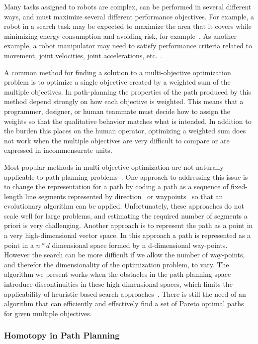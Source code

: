 \documentclass[phd]{byuprop}
\begin{document}
Many tasks assigned to robots are complex, can be performed in several different ways, and must maximize several different performance objectives.
For example, a robot in a search task may be expected to maximize the area that it covers while minimizing energy consumption and avoiding risk, for example~\cite{Mei2005,Yi2014}. 
As another example, a robot manipulator may need to satisfy performance criteria related to movement, joint velocities, joint accelerations, etc.~\cite{Pires2004}.

A common method for finding a solution to a multi-objective optimization problem is to optimize a single objective created by a weighted sum of the multiple objectives.  
In path-planning the properties of the path produced by this method depend strongly on how each objective is weighted. 
This means that a programmer, designer, or human teammate 
must decide how to assign the weights so that the qualitative behavior matches what is intended.  
In addition to the burden this places on the human operator, optimizing a weighted sum does not work when the multiple objectives are very difficult to compare or are expressed in incommensurate units.

Most popular methods in multi-objective optimization are not naturally applicable to path-planning problems~\cite{Zhang2007,Deb2014}.
One approach to addressing this issue is to change the representation for a path by coding a path as a sequence of fixed-length line segments represented by direction~\cite{Ahmed2013,Howlett2006} or waypoints~\cite{Sujit2009,Pires2004} so that an evolutionary algorithm can be applied. 
Unfortunately, these approaches do not scale well for large problems, and estimating the required number of segments a priori is very challenging. 
Another approach is to represent the path as a point in a very high-dimensional vector space.
In this approach a path is represented as a point in a $ n * d $ dimensional space formed by n d-dimensional way-points.
However the search can be more difficult if we allow the number of way-points, and therefor the dimensionality of the optimization problem, to vary. 
The algorithm we present works when the obstacles in the path-planning space introduce discontinuities in these high-dimensional spaces, which limits the applicability of heuristic-based search approaches~\cite{Sujit2009,Zhang2007}.
There is still the need of an algorithm that can efficiently and effectively find a set of Pareto optimal paths for given multiple objectives.

\subsubsection{Homotopy in Path Planning}
\end{document}
